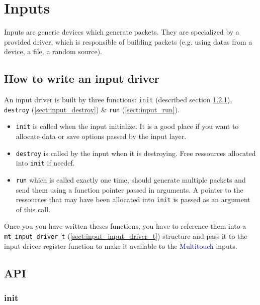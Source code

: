 \chapter{Inputs}

Inputs are generic devices which generate packets. They are specialized
by a provided driver, which is responsible of building packets 
(e.g. using datas from a device, a file, a random source).

%
%
\section{How to write an input driver}

An input driver is built by three functions: \texttt{init} 
(described section \ref{sect:input_init}),
\texttt{destroy} (\ref{sect:input_destroy}) \& \texttt{run}
(\ref{sect:input_run}).

\begin{itemize}
\item \texttt{init} is called when the input 
initialize. It is a good place if you want to allocate data or 
save options passed by the input layer.
\item \texttt{destroy} is called by the input when it 
is destroying. Free ressources allocated into \texttt{init} if
needef.
\item \texttt{run} which is called exactly one time, should generate 
multiple packets and send them using a function pointer passed in
arguments. A pointer to the ressources that may have been
allocated into \texttt{init} is passed as an argument of this
call.
\end{itemize}

Once you you have written theses functions, you have to reference them
into a \texttt{mt\_input\_driver\_t} (\ref{sect:input_input_driver_t})
structure and pass it to the input driver register function to make
it available to the \textcolor{darkblue}{Multitouch} inputs.

%
%
\section{API}

%
%
\subsection{init}
\label{sect:input_init}

